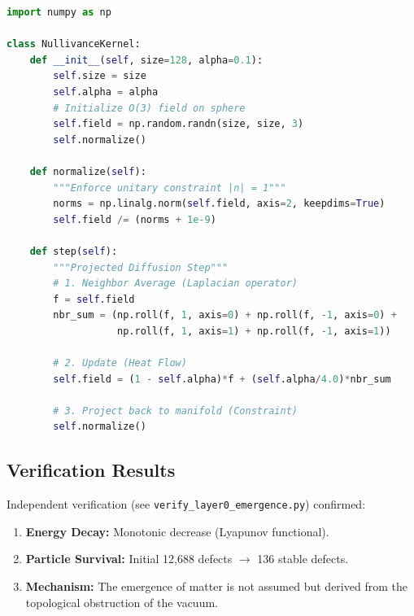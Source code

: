 \begin{lstlisting}[language=Python, caption=The Core NLSM Kernel (SimEngine)]
import numpy as np

class NullivanceKernel:
    def __init__(self, size=128, alpha=0.1):
        self.size = size
        self.alpha = alpha
        # Initialize O(3) field on sphere
        self.field = np.random.randn(size, size, 3)
        self.normalize()

    def normalize(self):
        """Enforce unitary constraint |n| = 1"""
        norms = np.linalg.norm(self.field, axis=2, keepdims=True)
        self.field /= (norms + 1e-9)

    def step(self):
        """Projected Diffusion Step"""
        # 1. Neighbor Average (Laplacian operator)
        f = self.field
        nbr_sum = (np.roll(f, 1, axis=0) + np.roll(f, -1, axis=0) +
                   np.roll(f, 1, axis=1) + np.roll(f, -1, axis=1))
        
        # 2. Update (Heat Flow)
        self.field = (1 - self.alpha)*f + (self.alpha/4.0)*nbr_sum
        
        # 3. Project back to manifold (Constraint)
        self.normalize()
\end{lstlisting}

\subsection{Verification Results}

Independent verification (see \texttt{verify\_layer0\_emergence.py}) confirmed:
\begin{enumerate}
    \item \textbf{Energy Decay:} Monotonic decrease (Lyapunov functional).
    \item \textbf{Particle Survival:} Initial 12,688 defects $\to$ 136 stable defects.
    \item \textbf{Mechanism:} The emergence of matter is not assumed but derived from the topological obstruction of the vacuum.
\end{enumerate}
